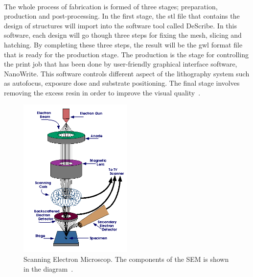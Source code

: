 \documentclass[12pt,a4paper,titlepage]{report}
\begin{document}
\paragraph{}
The whole process of fabrication is formed of three stages; preparation, production and post-processing. 
In the first stage, the \ac*{stl} file that contains the design of structures will import into the software tool
 called DeScribe. In this software, each design will go though three steps for fixing the mesh, slicing and
 hatching. By completing these three steps, the result will be the \ac*{gwl} format file that is ready for the 
production stage.   
The production is the stage for controlling the print job that has been done by user-friendly
 graphical interface software, NanoWrite. This software controls different aspect of the lithography 
system such as autofocus, exposure dose and substrate positioning.  
The final stage involves removing the excess resin in order to improve the visual quality~\citep{Doe:2014Feb:Online}. 

\begin{figure}
  \begin{center}
    \includegraphics[width=0.5\textwidth]{SEM}
  \caption[Scanning Electron Microscope]{Scanning Electron Microscop. The components of the \ac*{SEM} is shown 
in the diagram~\citep{Doe:2014Jan:Online}.}
  \label{SEM}
\end{center}
\end{figure}
\end{document}
